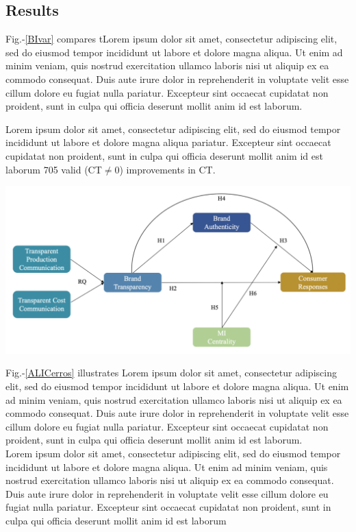 \documentclass[a0,portrait]{a0poster}
\begin{document}
\begin{minipage}[c]{\linewidth}
\begin{framed}
\begin{multicols}{2}
\section*{Results}
\color{Black}
Fig.-\ref{BIvar} compares tLorem ipsum dolor sit amet, consectetur adipiscing elit, sed do eiusmod tempor incididunt ut labore et dolore magna aliqua. Ut enim ad minim veniam, quis nostrud exercitation ullamco laboris nisi ut aliquip ex ea commodo consequat. Duis aute irure dolor in reprehenderit in voluptate velit esse cillum dolore eu fugiat nulla pariatur. Excepteur sint occaecat cupidatat non proident, sunt in culpa qui officia deserunt mollit anim id est laborum.

Lorem ipsum dolor sit amet, consectetur adipiscing elit, sed do eiusmod tempor incididunt ut labore et dolore magna aliqua pariatur. Excepteur sint occaecat cupidatat non proident, sunt in culpa qui officia deserunt mollit anim id est laborum 705 valid (CT$\neq$0) improvements in CT.
\begin{center}
\includegraphics[width=0.9\linewidth]{figures/placeholder}
\label{ALICerros}
\end{center}
Fig.-\ref{ALICerros} illustrates Lorem ipsum dolor sit amet, consectetur adipiscing elit, sed do eiusmod tempor incididunt ut labore et dolore magna aliqua. Ut enim ad minim veniam, quis nostrud exercitation ullamco laboris nisi ut aliquip ex ea commodo consequat. Duis aute irure dolor in reprehenderit in voluptate velit esse cillum dolore eu fugiat nulla pariatur. Excepteur sint occaecat cupidatat non proident, sunt in culpa qui officia deserunt mollit anim id est laborum.\\
Lorem ipsum dolor sit amet, consectetur adipiscing elit, sed do eiusmod tempor incididunt ut labore et dolore magna aliqua. Ut enim ad minim veniam, quis nostrud exercitation ullamco laboris nisi ut aliquip ex ea commodo consequat. Duis aute irure dolor in reprehenderit in voluptate velit esse cillum dolore eu fugiat nulla pariatur. Excepteur sint occaecat cupidatat non proident, sunt in culpa qui officia deserunt mollit anim id est laborum


\end{multicols}
\end{framed}
\end{minipage}
\end{document}
